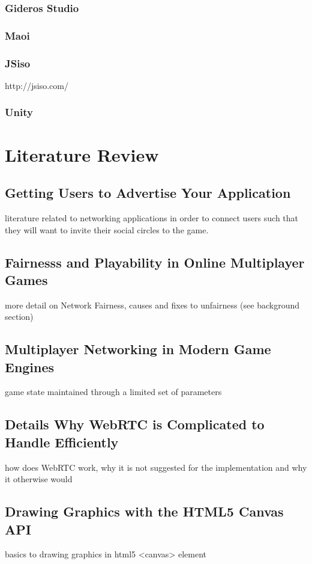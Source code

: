 \documentclass[bsc,frontabs,twoside,singlespacing,parskip,deptreport]{infthesis}     %
\begin{document}
\subsection{Gideros Studio}
\subsection{Maoi}

\subsection{JSiso}http://jsiso.com/
\subsection{Unity}






\chapter{Literature Review}

\section{Getting Users to Advertise Your Application}
literature related to networking applications in order to connect users such that they will want to invite their social circles to the game.

\section{Fairnesss and Playability in Online Multiplayer Games}
more detail on Network Fairness, causes and fixes to unfairness (see background section)

\section{Multiplayer Networking in Modern Game Engines}
game state maintained through a limited set of parameters

\section{Details Why WebRTC is Complicated to Handle Efficiently}
how does WebRTC work, why it is not suggested for the implementation and why it otherwise would

\section{Drawing Graphics with the HTML5 Canvas API}
basics to drawing graphics in html5 <canvas> element
\end{document}
